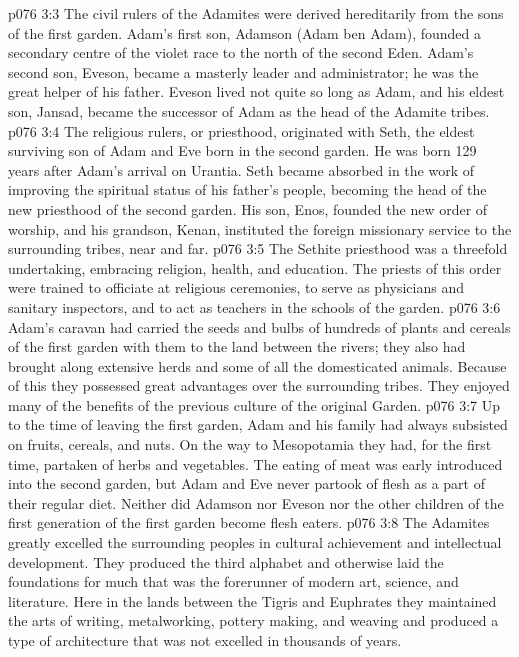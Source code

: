 \vs p076 3:3 \pc The civil rulers of the Adamites were derived hereditarily from the sons of the first garden. Adam’s first son, Adamson (Adam ben Adam), founded a secondary centre of the violet race to the north of the second Eden. Adam’s second son, Eveson, became a masterly leader and administrator; he was the great helper of his father. Eveson lived not quite so long as Adam, and his eldest son, Jansad, became the successor of Adam as the head of the Adamite tribes.
\vs p076 3:4 \pc The religious rulers, or priesthood, originated with Seth, the eldest surviving son of Adam and Eve born in the second garden. He was born 129 years after Adam’s arrival on Urantia. Seth became absorbed in the work of improving the spiritual status of his father’s people, becoming the head of the new priesthood of the second garden. His son, Enos, founded the new order of worship, and his grandson, Kenan, instituted the foreign missionary service to the surrounding tribes, near and far.
\vs p076 3:5 The Sethite priesthood was a threefold undertaking, embracing religion, health, and education. The priests of this order were trained to officiate at religious ceremonies, to serve as physicians and sanitary inspectors, and to act as teachers in the schools of the garden.
\vs p076 3:6 \pc Adam’s caravan had carried the seeds and bulbs of hundreds of plants and cereals of the first garden with them to the land between the rivers; they also had brought along extensive herds and some of all the domesticated animals. Because of this they possessed great advantages over the surrounding tribes. They enjoyed many of the benefits of the previous culture of the original Garden.
\vs p076 3:7 Up to the time of leaving the first garden, Adam and his family had always subsisted on fruits, cereals, and nuts. On the way to Mesopotamia they had, for the first time, partaken of herbs and vegetables. The eating of meat was early introduced into the second garden, but Adam and Eve never partook of flesh as a part of their regular diet. Neither did Adamson nor Eveson nor the other children of the first generation of the first garden become flesh eaters.
\vs p076 3:8 \pc The Adamites greatly excelled the surrounding peoples in cultural achievement and intellectual development. They produced the third alphabet and otherwise laid the foundations for much that was the forerunner of modern art, science, and literature. Here in the lands between the Tigris and Euphrates they maintained the arts of writing, metalworking, pottery making, and weaving and produced a type of architecture that was not excelled in thousands of years.
